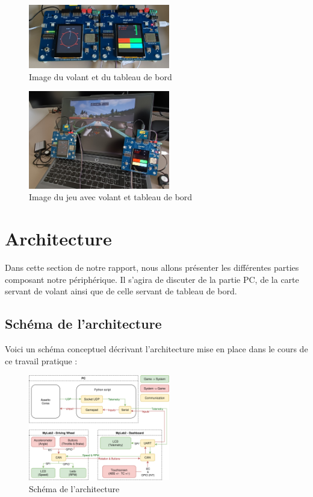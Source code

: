 \documentclass[french, 11pt]{article}
\begin{document}
	\begin{figure}[H]
		\centering
		\includegraphics[width=0.55\textwidth]{Images/both_flat.jpg}
		\caption{Image du volant et du tableau de bord}
	\end{figure}

	\begin{figure}[H]
		\centering
		\includegraphics[width=0.55\textwidth]{Images/both_with_screen.jpg}
		\caption{Image du jeu avec volant et tableau de bord}
	\end{figure}


    \section{Architecture}

		Dans cette section de notre rapport, nous allons présenter les différentes parties composant notre périphérique. Il s'agira de discuter de la partie PC, de la carte servant de volant ainsi que de celle servant de tableau de bord.

		\subsection{Schéma de l'architecture}

			Voici un schéma conceptuel décrivant l'architecture mise en place dans le cours de ce travail pratique :

			\begin{figure}[H]
				\centering
				\includegraphics[width=0.55\textwidth]{Images/architecture.drawio.png}
				\caption{Schéma de l'architecture}
			\end{figure}
			
\end{document}
